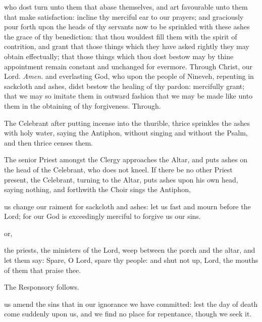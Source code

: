\clearpage
{}
{} who dost turn unto them that abase themselves, and art favourable unto them that make satisfaction: incline thy merciful ear to our prayers; and graciously pour forth upon the heads of thy servants now to be sprinkled with these ashes the grace of thy benediction: that thou wouldest fill them with the spirit of contrition, and grant that those things which they have asked rightly they may obtain effectually; that those things which thou dost bestow may by thine appointment remain constant and unchanged for evermore. Through Christ, our Lord. \textit{Amen.}
{} and everlasting God, who upon the people of Nineveh, repenting in sackcloth and ashes, didst bestow the healing of thy pardon: mercifully grant; that we may so imitate them in outward fashion that we may be made like unto them in the obtaining of thy forgiveness. Through.
\begin{rubric}
    The Celebrant after putting incense into the thurible, thrice sprinkles the ashes with holy water, saying the Antiphon,  without singing and without the Psalm, and then thrice censes them.
\end{rubric}
\begin{rubric}
    The senior Priest amongst the Clergy approaches the Altar, and puts ashes on the head of the Celebrant, who does not kneel. If there be no other Priest present, the Celebrant, turning to the Altar, puts ashes upon his own head, saying nothing, and forthwith the Choir sings the Antiphon,
\end{rubric}
 us change our raiment for sackcloth and ashes: let us fast and mourn before the Lord; for our God is exceedingly merciful to forgive us our sins.
\begin{inhead}
    or,
\end{inhead}
 the priests, the ministers of the Lord, weep between the porch and the altar, and let them say: Spare, O Lord, spare thy people: and shut not up, Lord, the mouths of them that praise thee.
\begin{rubric}
    The Responsory follows.
\end{rubric}
 us amend the sins that in our ignorance we have committed: lest the day of death come suddenly upon us, and we find no place for repentance, though we seek it.\par
{}

